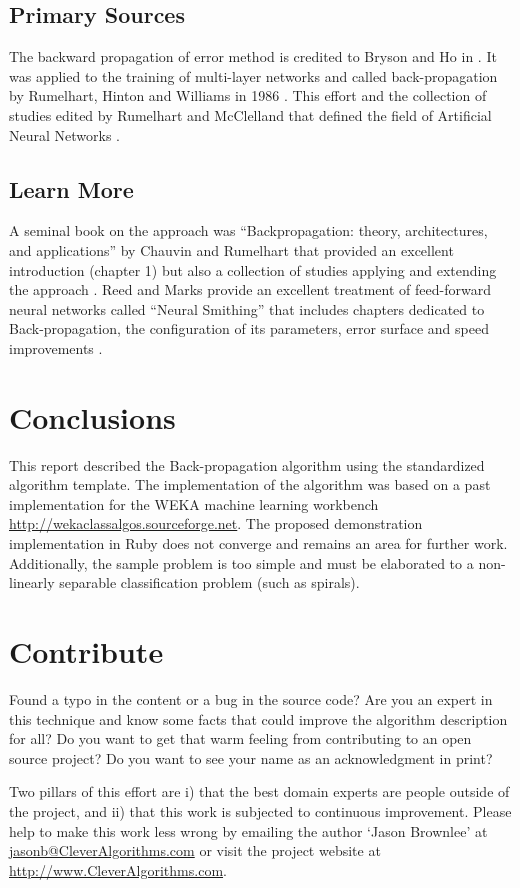 \documentclass[a4paper, 11pt]{article}
\makeatletter
\newcommand{\myreportauthor}{Jason Brownlee}
\newcommand{\myreportemail}{jasonb@CleverAlgorithms.com}
\newcommand{\myreportwebsite}{http://www.CleverAlgorithms.com}
\makeatother
\begin{document}
% 
% 
\subsection{Primary Sources}
The backward propagation of error method is credited to Bryson and Ho in \cite{Bryson1969}. It was applied to the training of multi-layer networks and called back-propagation by Rumelhart, Hinton and Williams in 1986 \cite{Rumelhart1986b, Rumelhart1986c}. 
This effort and the collection of studies edited by Rumelhart and McClelland that defined the field of Artificial Neural Networks \cite{Rumelhart1986, Rumelhart1986a}.


% 
% 
\subsection{Learn More}
A seminal book on the approach was ``Backpropagation: theory, architectures, and applications'' by Chauvin and Rumelhart that provided an excellent introduction (chapter 1) but also a collection of studies applying and extending the approach \cite{Chauvin1995}.
Reed and Marks provide an excellent treatment of feed-forward neural networks called ``Neural Smithing'' that includes chapters dedicated to Back-propagation, the configuration of its parameters, error surface and speed improvements \cite{Reed1999}.

% 
% 
\section{Conclusions}
\label{sec:conclusions}
This report described the Back-propagation algorithm using the standardized algorithm template. The implementation of the algorithm was based on a past implementation for the WEKA machine learning workbench \url{http://wekaclassalgos.sourceforge.net}. The proposed demonstration implementation in Ruby does not converge and remains an area for further work. Additionally, the sample problem is too simple and must be elaborated to a non-linearly separable classification problem (such as spirals).

% 
% 
\section{Contribute}
\label{sec:contribute}
Found a typo in the content or a bug in the source code? 
Are you an expert in this technique and know some facts that could improve the algorithm description for all?
Do you want to get that warm feeling from contributing to an open source project? 
Do you want to see your name as an acknowledgment in print?

Two pillars of this effort are i) that the best domain experts are people outside of the project, and ii) that this work is subjected to continuous improvement. 
Please help to make this work less wrong by emailing the author `\myreportauthor' at \url{\myreportemail} or visit the project website at \url{\myreportwebsite}.



\end{document}
